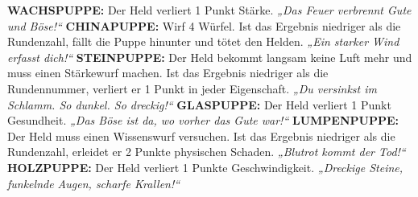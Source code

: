     \begin{itemize}

\bitem \textbf{WACHSPUPPE:} Der Held verliert 1 Punkt Stärke. \emph{„Das Feuer verbrennt Gute und Böse!“}
\bitem \textbf{CHINAPUPPE:} Wirf 4 Würfel. Ist das Ergebnis niedriger als die Rundenzahl, fällt die Puppe hinunter und tötet den Helden. \emph{„Ein starker Wind erfasst dich!“}
\bitem \textbf{STEINPUPPE:} Der Held bekommt langsam keine Luft mehr und muss einen Stärkewurf machen. Ist das Ergebnis niedriger als die Rundennummer, verliert er 1 Punkt in jeder Eigenschaft. \emph{„Du versinkst im Schlamm. So dunkel. So dreckig!“}
\bitem \textbf{GLASPUPPE:} Der Held verliert 1 Punkt Gesundheit. \emph{„Das Böse ist da, wo vorher das Gute war!“}
\bitem \textbf{LUMPENPUPPE:} Der Held muss einen Wissenswurf versuchen. Ist das Ergebnis niedriger als die Rundenzahl, erleidet er 2 Punkte physischen Schaden. \emph{„Blutrot kommt der Tod!“}
\bitem \textbf{HOLZPUPPE:} Der Held verliert 1 Punkte Geschwindigkeit. \emph{„Dreckige Steine, funkelnde Augen, scharfe Krallen!“}
    \end{itemize}



